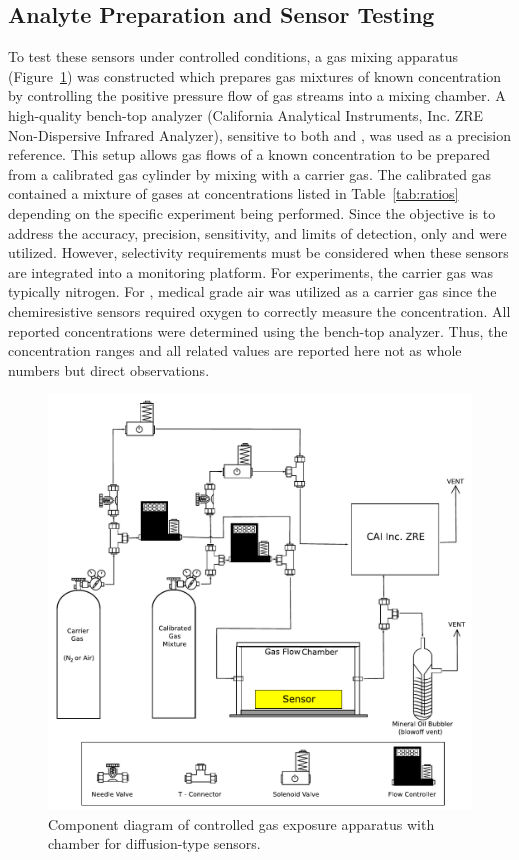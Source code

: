 \documentclass[sensors,article,submit,moreauthors,pdftex]{Definitions/mdpi}
\begin{document}
		\subsection{Analyte Preparation and Sensor Testing}
			
			To test these sensors under controlled conditions, a gas mixing apparatus (Figure~\ref{fig:exposureapparatus}) was constructed which prepares gas mixtures of known concentration by controlling the positive pressure flow of gas streams into a mixing chamber.
			A high-quality bench-top analyzer (California Analytical Instruments, Inc. ZRE Non-Dispersive Infrared Analyzer), sensitive to both  and , was used as a precision reference.
			This setup allows gas flows of a known concentration to be prepared from a calibrated gas cylinder by mixing with a carrier gas.
			The calibrated gas contained a mixture of gases at concentrations listed in Table~\ref{tab:ratios} depending on the specific experiment being performed.
			Since the objective is to address the accuracy, precision, sensitivity, and limits of detection, only  and  were utilized.
			However, selectivity requirements must be considered when these sensors are integrated into a monitoring platform.
			For  experiments, the carrier gas was typically nitrogen.
			For , medical grade air was utilized as a carrier gas since the chemiresistive sensors required oxygen to correctly measure the  concentration.
			All reported concentrations were determined using the bench-top analyzer.
			Thus, the concentration ranges and all related values are reported here not as whole numbers but direct observations.
			
			\begin{figure}[!t]
				\centering
				\includegraphics[width=\columnwidth]{honey1.pdf}
				\caption{Component diagram of controlled gas exposure apparatus with chamber for diffusion-type sensors.}
				\label{fig:exposureapparatus}
			\end{figure}
				
\end{document}

